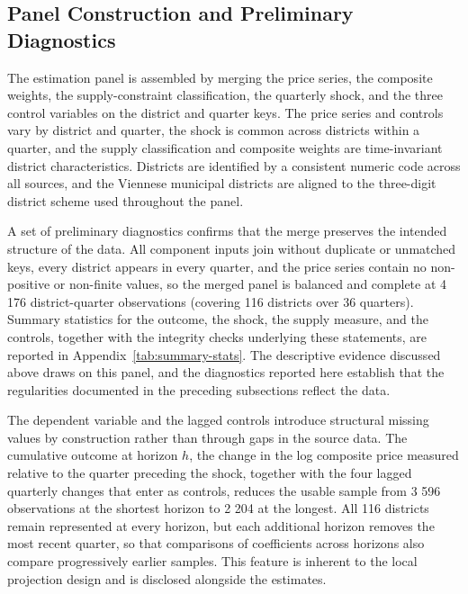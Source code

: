 \documentclass[a4paper,12pt, headsepline]{scrartcl}
\numberwithin{equation}{section}
\begin{document}
\subsection{Panel Construction and Preliminary Diagnostics}\label{subsec:panel-construction}
The estimation panel is assembled by merging the price series, the composite weights, the supply-constraint classification, the quarterly shock, and the three control variables on the district and quarter keys. The price series and controls vary by district and quarter, the shock is common across districts within a quarter, and the supply classification and composite weights are time-invariant district characteristics. Districts are identified by a consistent numeric code across all sources, and the Viennese municipal districts are aligned to the three-digit district scheme used throughout the panel.

A set of preliminary diagnostics confirms that the merge preserves the intended structure of the data. All component inputs join without duplicate or unmatched keys, every district appears in every quarter, and the price series contain no non-positive or non-finite values, so the merged panel is balanced and complete at 4 176 district-quarter observations (covering 116 districts over 36 quarters). Summary statistics for the outcome, the shock, the supply measure, and the controls, together with the integrity checks underlying these statements, are reported in Appendix~\ref{tab:summary-stats}. The descriptive evidence discussed above draws on this panel, and the diagnostics reported here establish that the regularities documented in the preceding subsections reflect the data.

The dependent variable and the lagged controls introduce structural missing values by construction rather than through gaps in the source data. The cumulative outcome at horizon $h$, the change in the log composite price measured relative to the quarter preceding the shock, together with the four lagged quarterly changes that enter as controls, reduces the usable sample from 3 596 observations at the shortest horizon to 2 204 at the longest. All 116 districts remain represented at every horizon, but each additional horizon removes the most recent quarter, so that comparisons of coefficients across horizons also compare progressively earlier samples. This feature is inherent to the local projection design and is disclosed alongside the estimates.

\end{document}
